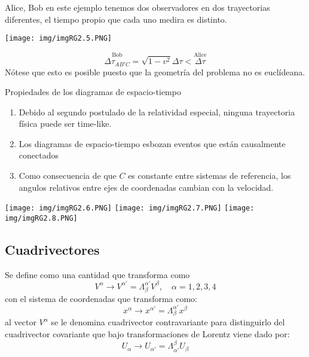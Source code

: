 \documentclass[../main]{subfiles}
\begin{document}
\begin{adjustwidth}{0pt}{-100pt}
 Alice, Bob en este ejemplo tenemos dos observadores en dos trayectorias diferentes, el tiempo propio que cada uno medira es distinto. 
\begin{center}
    \texttt{[image: img/imgRG2.5.PNG]}
\end{center}
\begin{equation}
    \stackrel{\text{Bob}}{\Delta \tau_{AB'C}}=\sqrt{1-v^2}\Delta \tau < \stackrel{\text{Alice}}{\Delta \tau}
\end{equation}
Nótese que esto es posible puesto que la geometría del problema no es euclídeana.

Propiedades de los diagramas de espacio-tiempo 
\begin{enumerate}
    \item Debido al segundo postulado de la relatividad especial, ninguna trayectoria física puede ser time-like.
    \item Los diagramas de espacio-tiempo esbozan eventos que están causalmente conectados
    \item Como consecuencia de que $C$ es constante entre sistemas de referencia, los angulos relativos entre ejes de coordenadas cambian con la velocidad.
\end{enumerate}
\begin{center}
    \texttt{[image: img/imgRG2.6.PNG]}
    \texttt{[image: img/imgRG2.7.PNG]}
    \texttt{[image: img/imgRG2.8.PNG]}    
\end{center}

\subsection{Cuadrivectores}
Se define como una cantidad que transforma como 
\begin{equation}
    V^{\alpha} \rightarrow V^{\alpha'}=\Lambda^{\alpha'}_{\beta} V^{\beta},\quad \alpha=1, 2, 3, 4
\end{equation}
con el sistema de coordenadas que transforma como:
\begin{equation}
    x^{\alpha}\rightarrow x^{\alpha'}=\Lambda^{\alpha'}_{\beta}x^{\beta}
\end{equation}
al vector $V^{\alpha}$ se le denomina cuadrivector contravariante para distinguirlo del cuadrivector covariante que bajo transformaciones de Lorentz viene dado por: 
\begin{equation}
    U_{\alpha} \rightarrow U_{\alpha'}=\Lambda_{\alpha'}^{\beta} U_{\beta}
\end{equation}


\end{adjustwidth}
\end{document}
